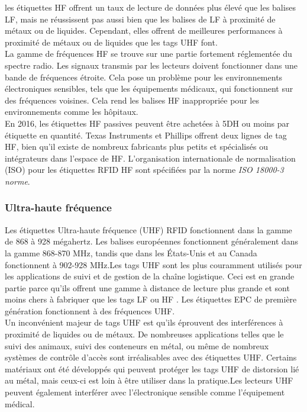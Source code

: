 \documentclass[11pt, a4paper, twoside]{book}
\begin{document}
les étiquettes HF offrent un taux de lecture de données plus élevé que les balises LF, mais ne réussissent pas aussi bien que les balises de LF à proximité de métaux ou de liquides. Cependant, elles offrent de meilleures performances à proximité de métaux ou de liquides que les tags UHF font.\\

La gamme de fréquences HF se trouve sur une partie fortement réglementée du spectre radio. Les signaux transmis par les lecteurs doivent fonctionner dans une bande de fréquences étroite. Cela pose un problème pour les environnements électroniques sensibles, tels que les équipements médicaux, qui fonctionnent sur des fréquences voisines. Cela rend les balises HF inappropriée pour les environnements comme les hôpitaux.\\

En 2016, les étiquettes HF passives peuvent être achetées à 5DH ou moins par étiquette en quantité. Texas Instruments et Phillips offrent deux lignes de tag HF, bien qu'il existe de nombreux fabricants plus petits et spécialisés ou intégrateurs dans l'espace de HF.
L'organisation internationale de normalisation (ISO) pour les étiquettes RFID HF sont spécifiées par la norme \emph{ISO 18000-3 norme}.\\
\subsubsection{Ultra-haute fréquence}
Les étiquettes Ultra-haute fréquence (UHF) RFID fonctionnent dans la gamme de 868 à 928 mégahertz. Les balises européennes fonctionnent généralement dans la gamme 868-870 MHz, tandis que dans les États-Unis et au Canada fonctionnent à 902-928 MHz.Les tags UHF sont les plus couramment utilisés pour les applications de suivi et de gestion de la chaîne logistique. Ceci est en grande partie parce qu'ils offrent une gamme à distance de lecture plus grande et sont moins chers à fabriquer  que les tags LF ou HF . Les étiquettes EPC de première génération fonctionnent à des fréquences UHF.\\

Un inconvénient majeur de tags UHF est qu'ils éprouvent des interférences à proximité de liquides ou de métaux. De nombreuses applications telles que le suivi des animaux, suivi des conteneurs en métal, ou même de nombreux systèmes de contrôle d'accès sont irréalisables avec des étiquettes UHF. Certains matériaux ont été développés qui peuvent protéger les tags UHF de distorsion lié au métal, mais ceux-ci est loin à être utiliser dans la pratique.Les lecteurs UHF peuvent également interférer avec l'électronique sensible comme l'équipement médical.\\
\end{document}
